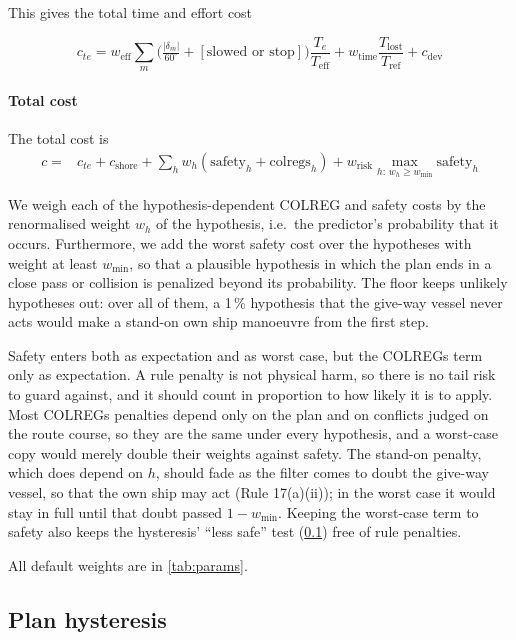 \documentclass[10pt,a4paper]{article}
\begin{document}
This gives the  total time and effort cost

\begin{equation}
  c_{te} = 
   w_{\text{eff}}\sum_m\Big(\tfrac{|\delta_m|}{60^\circ} + [\text{slowed or stop}]\Big)\frac{T_e}{T_{\text{eff}}}
       + w_{\text{time}}\frac{T_{\text{lost}}}{T_{\text{ref}}} + c_{\text{dev}}
\end{equation}


\paragraph{Total cost}

The total cost is
\begin{align}
  c = {}& c_{te} + c_{\text{shore}} + \sum_h w_h(\text{safety}_h + \text{colregs}_h) +
   w_{\text{risk}}\max_{h:\,w_h \ge w_{\min}} \text{safety}_h
  \label{eq:cost}
\end{align}

We weigh each of the hypothesis-dependent COLREG and safety costs by the renormalised weight $w_h$ of the
hypothesis, i.e.\ the predictor's probability that it occurs. Furthermore, we add the worst safety cost
over the hypotheses with weight at least $w_{\min}$, so that a plausible hypothesis in which the plan ends
in a close pass or collision is penalized beyond its probability. The floor keeps unlikely hypotheses out:
over all of them, a 1\,\% hypothesis that the give-way vessel never acts would make a stand-on own ship
manoeuvre from the first step.

Safety enters both as expectation and as worst case, but the COLREGs term only as expectation. A rule
penalty is not physical harm, so there is no tail risk to guard against, and it should count in proportion
to how likely it is to apply. Most COLREGs penalties depend only on the plan and on conflicts judged on
the route course, so they are the same under every hypothesis, and a worst-case copy would merely double
their weights against safety. The stand-on penalty, which does depend on $h$, should fade as the filter
comes to doubt the give-way vessel, so that the own ship may act (Rule 17(a)(ii)); in the worst case it
would stay in full until that doubt passed $1 - w_{\min}$. Keeping the worst-case term to safety also
keeps the hysteresis' ``less safe'' test (\cref{sec:hysteresis}) free of rule penalties.

All default weights are in \cref{tab:params}.

\subsection{Plan hysteresis}\label{sec:hysteresis}
\end{document}
